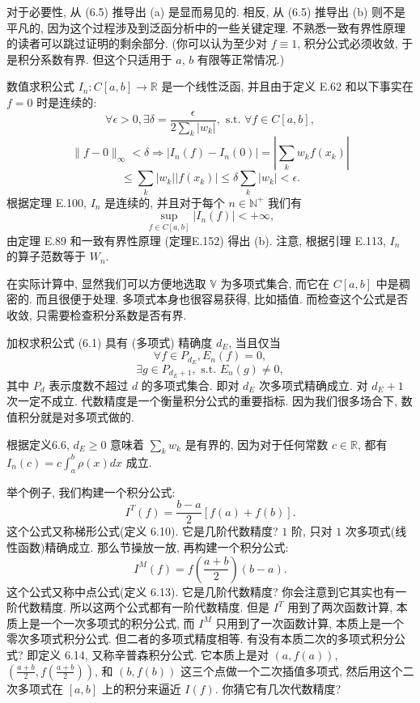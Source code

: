 \documentclass[a4paper]{ctexart}
\newcommand{\hl}[1]
{\noindent {\bf {#1}}}
\begin{document}
{对于必要性, 从 (6.5) 推导出 (a) 是显而易见的. 相反, 从 (6.5) 推导出 (b) 则不是平凡的, 
因为这个过程涉及到泛函分析中的一些关键定理. 不熟悉一致有界性原理的读者可以跳过证明的剩余部分. 
(你可以认为至少对 $f \equiv 1$, 积分公式必须收敛, 于是积分系数有界. 但这个只适用于 $a$, $b$ 有限等正常情况.)

数值求积公式 $I_n : C[a, b] \rightarrow \mathbb{R}$ 是一个线性泛函, 并且由于定义 E.62 和以下事实在 $f = 0$ 
时是连续的:
\[ 
\forall \epsilon > 0, \exists \delta = \frac{\epsilon}{2 \sum_k |w_k|}, 
\text{ s.t. } \forall f \in C[a, b], 
\]
\[ 
\|f - 0\|_{\infty} < \delta \Rightarrow |I_n(f) - I_n(0)| = \left| \sum_k w_k f(x_k) \right|
\]
\[ 
\leq \sum_k |w_k| |f(x_k)| \leq \delta \sum_k |w_k| < \epsilon. 
\]
根据定理 E.100, $I_n$ 是连续的, 并且对于每个 $n \in \mathbb{N}^+$ 我们有
\[ 
\sup_{f \in C[a, b]} |I_n(f)| < +\infty, 
\]
由定理 E.89 和一致有界性原理 (定理E.152) 得出 (b). 注意, 根据引理 E.113, $I_n$ 的算子范数等于 $W_n$.

在实际计算中, 显然我们可以方便地选取 $\mathbb{V}$ 为多项式集合, 而它在 $C[a, b]$ 中是稠密的. 而且很便于处理. 
多项式本身也很容易获得, 比如插值. 而检查这个公式是否收敛, 只需要检查积分系数是否有界. 

\hl{定义6.6} 加权求积公式 (6.1) 具有 (多项式) 精确度 $d_E$, 当且仅当
\[ 
\forall f \in P_{d_E}, E_n(f) = 0, 
\]
\[ 
\exists g \in P_{d_E+1}, \text{ s.t. } E_n(g) \neq 0, 
\]
其中 $P_d$ 表示度数不超过 $d$ 的多项式集合. 即对 $d_E$ 次多项式精确成立. 对 $d_E + 1$ 次一定不成立. 
代数精度是一个衡量积分公式的重要指标. 因为我们很多场合下, 数值积分就是对多项式做的.

\hl{例6.7} 根据定义6.6, $d_E \geq 0$ 意味着 $\sum_k w_k$ 是有界的, 
因为对于任何常数 $c \in \mathbb{R}$, 都有 $I_n(c) = c \int_{a}^{b} \rho(x)dx$ 成立.

举个例子, 我们构建一个积分公式:
$$
I^T(f) = \frac{b - a}{2} [f(a) + f(b)].
$$
这个公式又称梯形公式(定义 6.10). 它是几阶代数精度? 
$1$ 阶, 只对 $1$ 次多项式(线性函数)精确成立. 
那么节操放一放, 再构建一个积分公式:
$$
I^M(f) = f(\frac{a + b}{2})(b - a).
$$
这个公式又称中点公式(定义 6.13). 它是几阶代数精度? 你会注意到它其实也有一阶代数精度. 
所以这两个公式都有一阶代数精度. 
但是 $I^T$ 用到了两次函数计算, 本质上是一个一次多项式的积分公式, 而 $I^M$ 只用到了一次函数计算, 
本质上是一个零次多项式积分公式. 但二者的多项式精度相等. 
有没有本质二次的多项式积分公式? 即定义 6.14, 又称辛普森积分公式. 它本质上是对 $(a, f(a))$, 
$\left(\frac{a + b}{2}, f\left(\frac{a + b}{2}\right)\right)$, 和 $(b, f(b))$ 这三个点做一个二次插值多项式,
然后用这个二次多项式在 $[a, b]$ 上的积分来逼近 $I(f)$. 你猜它有几次代数精度?

}
\end{document}
